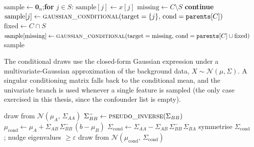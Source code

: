 \documentclass[12pt,a4paper,oneside]{article}
\begin{document}
\begin{algorithm}[H]
  \caption{POST\_INTERVENTIONAL\_SAMPLE --- draw from $P(X \mid \mathrm{do}(X_S = x_S))$}
  \label{alg:post_int}
  \begin{algorithmic}[1]
      \State $\text{sample} \gets \mathbf{0}_n$;\quad \textbf{for} $j \in S$: $\text{sample}[j] \gets x[j]$  
        \State $\text{missing} \gets C \setminus S$
        \quad \textbf{continue}\EndIf
          
            
            \State $\text{sample}[j] \gets \textsc{gaussian\_conditional}(\text{target}=\{j\},\,\text{cond}=\texttt{parents}[C])$
          \EndFor
        \Else  {}
          \State $\text{fixed} \gets C \cap S$  
          \State $\text{sample}[\text{missing}] \gets \textsc{gaussian\_conditional}(\text{target}=\text{missing},\,\text{cond}=\texttt{parents}[C] \cup \text{fixed})$
        \EndIf
      \EndFor
      \Return sample
    \EndFunction
  \end{algorithmic}
\end{algorithm}

The conditional draws use the closed-form Gaussian expression under a multivariate-Gaussian approximation of the background data, $X \sim \mathcal{N}(\mu, \Sigma)$. A singular conditioning matrix falls back to the conditional mean, and the univariate branch is used whenever a single feature is sampled (the only case exercised in this thesis, since the confounder list is empty).

\begin{algorithm}[H]
  \caption{GAUSSIAN\_CONDITIONAL --- closed-form conditional Gaussian draw}
  \label{alg:gaussian_cond}
  \begin{algorithmic}[1]
        \Return draw from $\mathcal{N}(\mu_A,\,\Sigma_{AA})$  
      \EndIf
      \State $\Sigma_{BB}^{-} \gets \textsc{pseudo\_inverse}(\Sigma_{BB})$
      \State $\mu_{\mathrm{cond}} \gets \mu_A + \Sigma_{AB}\,\Sigma_{BB}^{-}\,(b - \mu_B)$
      \State $\Sigma_{\mathrm{cond}} \gets \Sigma_{AA} - \Sigma_{AB}\,\Sigma_{BB}^{-}\,\Sigma_{BA}$
      \State symmetrise $\Sigma_{\mathrm{cond}}$; nudge eigenvalues $\geq \varepsilon$
      \Return draw from $\mathcal{N}(\mu_{\mathrm{cond}},\,\Sigma_{\mathrm{cond}})$  
    \EndFunction
  \end{algorithmic}
\end{algorithm}
\end{document}

